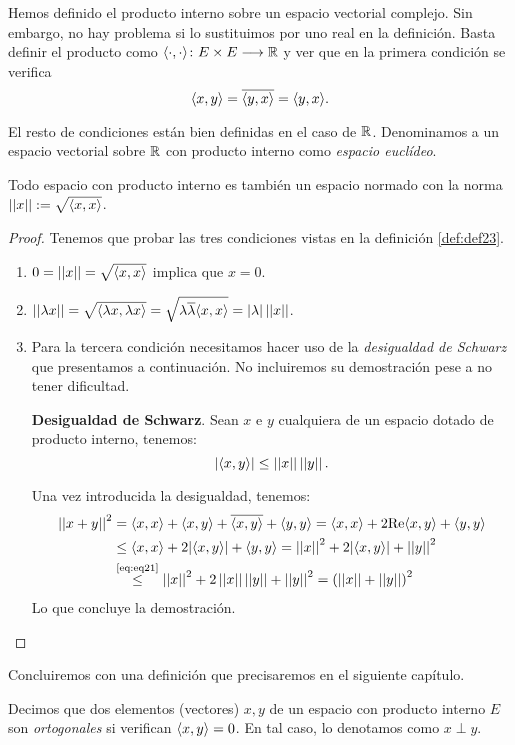 \begin{observation} Hemos definido el producto interno sobre un espacio vectorial complejo. Sin embargo, no hay problema si lo sustituimos por uno real en la definición. Basta definir el producto como $\langle\cdot,\cdot\rangle\colon E\times E\longrightarrow \mathbb{R}$ y ver que en la primera condición se verifica
\[\langle x,y\rangle=\overline{\langle y,x\rangle}=\langle y,x\rangle.\]

El resto de condiciones están bien definidas en el caso de $\mathbb{R}$. Denominamos a un espacio vectorial sobre $\mathbb{R}$ con producto interno como \textit{espacio euclídeo}.
\end{observation}

\begin{proposition} Todo espacio con producto interno es también un espacio normado con la norma $\left|\left|x\right|\right|:=\sqrt{\langle x,x\rangle}$.
\begin{proof} Tenemos que probar las tres condiciones vistas en la definición \ref{def:def23}.
\begin{enumerate}[label=\alph*)]
\item $0 = \left|\left|x\right|\right| = \sqrt{\langle x,x\rangle}$ implica que $x=0$.
\item $\left|\left|\lambda x\right|\right| = \sqrt{\langle\lambda x,\lambda x\rangle} = \sqrt{\lambda\overline{\lambda}\langle x,x\rangle}=|\lambda|\left|\left|x\right|\right|$.
\item Para la tercera condición necesitamos hacer uso de la \textit{desigualdad de Schwarz} que presentamos a continuación. No incluiremos su demostración pese a no tener dificultad.

\begin{thm} \textbf{Desigualdad de Schwarz}. Sean $x$ e $y$ cualquiera de un espacio dotado de producto interno, tenemos:
\begin{equation}\label{eq:eq21}
|\langle x,y\rangle|\leq\left|\left|x\right|\right|\left|\left|y\right|\right|.
\end{equation}
\end{thm}
Una vez introducida la desigualdad, tenemos:
\[
\begin{split}
\left|\left|x+y\right|\right|^2 &= \langle x,x\rangle + \langle x,y\rangle + \overline{\langle x,y\rangle} + \langle y,y\rangle = \langle x,x\rangle + 2\mathrm{Re}\langle x,y\rangle + \langle y,y\rangle\\
&\leq \langle x,x\rangle + 2|\langle x,y\rangle| + \langle y,y\rangle = \left|\left|x\right|\right|^2+ 2|\langle x,y\rangle|+\left|\left|y\right|\right|^2\\
&\overset{\textrm{\ref{eq:eq21}}}{\leq}\left|\left|x\right|\right|^2+ 2\left|\left|x\right|\right|\left|\left|y\right|\right|+\left|\left|y\right|\right|^2 = \left(\left|\left|x\right|\right|+\left|\left|y\right|\right|\right)^2
\end{split}
\]
Lo que concluye la demostración.
\end{enumerate}
\end{proof}
\end{proposition}

Concluiremos con una definición que precisaremos en el siguiente capítulo.

\begin{definition} Decimos que dos elementos (vectores) $x,y$ de un espacio con producto interno $E$ son \textit{ortogonales} si verifican $\langle x,y\rangle=0$. En tal caso, lo denotamos como $x\perp y$.
\end{definition}